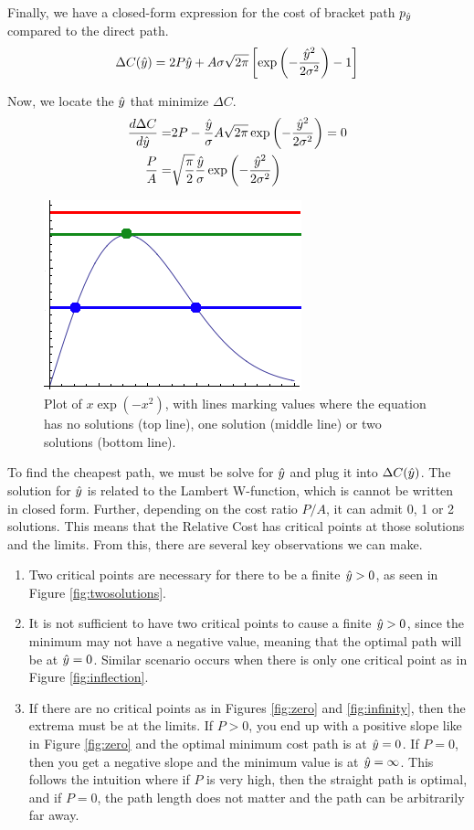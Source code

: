 Finally, we have a closed-form expression for the cost of bracket path $p_{\hat{y}}$ compared to the direct path.
\begin{equation}
\Delta C(\hat{y}) = 2P\hat{y} + A\sigma\sqrt{2\pi}\left[\exp\left(-\frac{\hat{y}^2}{2\sigma^2}\right) - 1\right]
\end{equation}

Now, we locate the $\hat{y}$ that minimize $\Delta C$.
\begin{align}
\frac{d\Delta C}{d\hat{y}} = 
&2P - \frac{\hat{y}}{\sigma}A\sqrt{2\pi} \exp\left(-\frac{\hat{y}^2}{2\sigma^2} \right) = 0 \\
  \frac{P}{A} =& \sqrt{\frac{\pi}{2}} \frac{\hat{y}}{\sigma} \exp\left(-\frac{\hat{y}^2}{2\sigma^2} \right)
\end{align}
\begin{figure}
\centering
\includegraphics[width=0.4\columnwidth]{graphix/lambert.png}
\caption{Plot of $x \exp(-x^2)$, with lines marking values where the equation has no solutions (top line), one solution (middle line) or two solutions (bottom line).}
\label{fig:lambert}
\end{figure}

To find the cheapest path, we must be solve for $\hat{y}$ and plug it into $\Delta C(\hat{y})$. The solution for $\hat{y}$ is related to the Lambert W-function, which is cannot be written in closed form.  Further, depending on the cost ratio $P/A$, it can admit 0, 1 or 2 solutions. This means that the Relative Cost has critical points at those solutions and the limits. From this, there are several key observations we can make. 
\begin{enumerate}
\item Two critical points are necessary for there to be a finite $\hat{y}>0$, as seen in Figure \ref{fig:twosolutions}. 
\item It is not sufficient to have two critical points to cause a finite $\hat{y}>0$, since the minimum may not have a negative value, meaning that the optimal path will be at $\hat{y}=0$. Similar scenario occurs when there is only one critical point as in Figure \ref{fig:inflection}. 
\item If there are no critical points as in Figures \ref{fig:zero} and \ref{fig:infinity}, then the extrema must be at the limits. If $P>0$, you end up with a positive slope like in Figure \ref{fig:zero} and the optimal minimum cost path is at $\hat{y}=0$. If $P=0$, then you get a negative slope and the minimum value is at $\hat{y}=\infty$. This follows the intuition where if $P$ is very high, then the straight path is optimal, and if $P=0$, the path length does not matter and the path can be arbitrarily far away. 
\end{enumerate}

